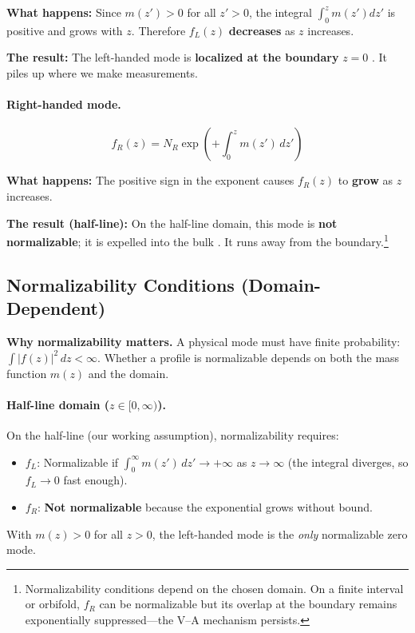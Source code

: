 \textbf{What happens:} Since $m(z') > 0$ for all $z' > 0$, the integral
$\int_0^z m(z') dz'$ is positive and grows with $z$. Therefore $f_L(z)$
\textbf{decreases} as $z$ increases.

\textbf{The result:} The left-handed mode is \textbf{localized at the boundary}
$z=0$ \tagDc{}. It piles up where we make measurements.

\paragraph{Right-handed mode.}
\begin{equation}
    f_R(z) = N_R \exp\left(+\int_0^z m(z') \, dz'\right)
    \label{eq:ch9_fR_profile}
\end{equation}

\textbf{What happens:} The positive sign in the exponent causes $f_R(z)$ to
\textbf{grow} as $z$ increases.

\textbf{The result (half-line):} On the half-line domain, this mode is
\textbf{not normalizable}; it is expelled into the bulk \tagDc{}. It runs away
from the boundary.\footnote{Normalizability conditions depend on the chosen
domain. On a finite interval or orbifold, $f_R$ can be normalizable but its
overlap at the boundary remains exponentially suppressed---the V--A mechanism
persists. \tagDc{}}

\subsection{Normalizability Conditions (Domain-Dependent)}

\textbf{Why normalizability matters.} A physical mode must have finite probability:
$\int |f(z)|^2 \, dz < \infty$. Whether a profile is normalizable depends on
both the mass function $m(z)$ and the domain.

\paragraph{Half-line domain ($z \in [0, \infty)$).}
On the half-line (our working assumption), normalizability requires:
\begin{itemize}[nosep]
    \item $f_L$: Normalizable if $\int_0^\infty m(z')\,dz' \to +\infty$ as $z \to \infty$
          (the integral diverges, so $f_L \to 0$ fast enough).
    \item $f_R$: \textbf{Not normalizable} because the exponential grows without bound.
\end{itemize}
With $m(z) > 0$ for all $z > 0$, the left-handed mode is the \emph{only} normalizable
zero mode.

